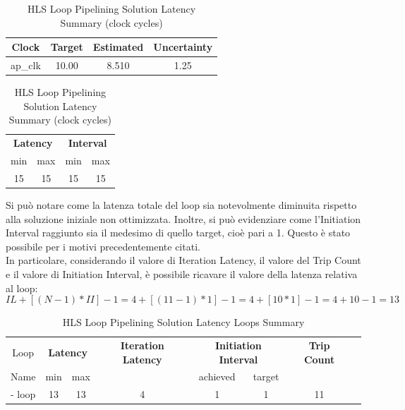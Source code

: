 \begin{table}[H]
    \centering
    \begin{minipage}[t]{0.45\linewidth}
        \centering
        \begin{tabular}{|c|c|c|c|}
            \hline
            \textbf{Clock} & \textbf{Target} & \textbf{Estimated} & \textbf{Uncertainty} \\
            \hline
            ap\_clk & 10.00 & 8.510 & 1.25 \\
            \hline
        \end{tabular}
        \caption{HLS Loop Pipelining Solution Timing Summary (ns)}
        \label{tab:hls-loop-pipelining-solution-timing-summary}
    \end{minipage}
    \hfill
    \begin{minipage}[t]{0.45\linewidth}
        \centering
        \begin{tabular}{|c|c|c|c|}
            \hline
            \multicolumn{2}{|c|}{\textbf{Latency}} & \multicolumn{2}{|c|}{\textbf{Interval}} \\
            min & max & min & max \\
            \hline
            15 & 15 & 15 & 15 \\
            \hline
        \end{tabular}
        \caption{HLS Loop Pipelining Solution Latency Summary (clock cycles)}
        \label{tab:hls-loop-pipelining-solution-latency-summary}
    \end{minipage}
\end{table}

Si può notare come la latenza totale del loop sia notevolmente diminuita rispetto alla soluzione iniziale non ottimizzata. Inoltre, si può evidenziare come l'Initiation Interval raggiunto sia il medesimo di quello target, cioè pari a 1. Questo è stato possibile per i motivi precedentemente citati.
\\
In particolare, considerando il valore di Iteration Latency, il valore del Trip Count e il valore di Initiation Interval, è possibile ricavare il valore della latenza relativa al loop:
\begin{equation}
	IL+[(N-1)*II]-1 = 4+[(11-1)*1]-1 = 4+[10*1]-1 = 4+10-1 = 13	
\end{equation}

\begin{table}[H]
    \centering
    \begin{tabular}{|c|c|c|c|c|c|c|c|}
        \hline
        \multicolumn{1}{|c|}{Loop} & \multicolumn{2}{|c|}{\textbf{Latency}} & \multicolumn{1}{c|}{\textbf{Iteration Latency}} & \multicolumn{2}{c|}{\textbf{Initiation Interval}} & \multicolumn{1}{c|}{\textbf{Trip Count}}  \\
        Name & min & max & & achieved & target &  \\
        \hline
        - loop & 13 & 13 & 4 & 1 & 1 & 11 \\
        \hline
    \end{tabular}
    \caption{HLS Loop Pipelining Solution Latency Loops Summary }
    \label{tab:hls-loop-pipelining-solution-loop-summary}
\end{table}

